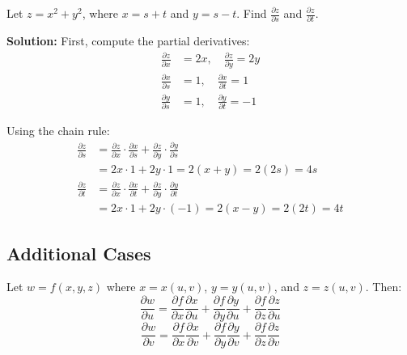 \begin{eg}
  Let \(z = x^2 + y^2\), where \(x = s + t\) and \(y = s - t\). Find \(\frac{\partial z}{\partial s}\) and \(\frac{\partial z}{\partial t}\).

  \textbf{Solution:}
  First, compute the partial derivatives:
  \begin{align}
    \frac{\partial z}{\partial x} &= 2x, \quad \frac{\partial z}{\partial y} = 2y \\
    \frac{\partial x}{\partial s} &= 1, \quad \frac{\partial x}{\partial t} = 1 \\
    \frac{\partial y}{\partial s} &= 1, \quad \frac{\partial y}{\partial t} = -1
  \end{align}

  Using the chain rule:
  \begin{align}
    \frac{\partial z}{\partial s} &= \frac{\partial z}{\partial x} \cdot \frac{\partial x}{\partial s} + \frac{\partial z}{\partial y} \cdot \frac{\partial y}{\partial s} \\
                                  &= 2x \cdot 1 + 2y \cdot 1 = 2(x + y) = 2(2s) = 4s \\
    \frac{\partial z}{\partial t} &= \frac{\partial z}{\partial x} \cdot \frac{\partial x}{\partial t} + \frac{\partial z}{\partial y} \cdot \frac{\partial y}{\partial t} \\
                                  &= 2x \cdot 1 + 2y \cdot (-1) = 2(x - y) = 2(2t) = 4t
  \end{align}
\end{eg}

\subsection{Additional Cases}

\begin{eg}
  Let \(w = f(x, y, z)\) where \(x = x(u, v)\), \(y = y(u, v)\), and \(z = z(u, v)\). Then:
  \[
    \frac{\partial w}{\partial u} = \frac{\partial f}{\partial x} \frac{\partial x}{\partial u} + \frac{\partial f}{\partial y} \frac{\partial y}{\partial u} + \frac{\partial f}{\partial z} \frac{\partial z}{\partial u}
  \]
  \[
    \frac{\partial w}{\partial v} = \frac{\partial f}{\partial x} \frac{\partial x}{\partial v} + \frac{\partial f}{\partial y} \frac{\partial y}{\partial v} + \frac{\partial f}{\partial z} \frac{\partial z}{\partial v}
  \]
\end{eg}

